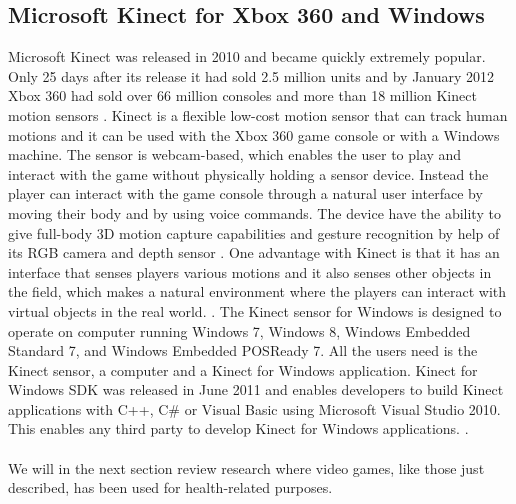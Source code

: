 \subsection{Microsoft Kinect for Xbox 360 and Windows}
Microsoft Kinect was released in 2010 and became quickly extremely popular. Only 25 days after its release it had sold 2.5 million units and by January 2012 Xbox 360 had sold over 66 million consoles and more than 18 million Kinect motion sensors \cite{consoles} \cite{kinectsold}. Kinect is a flexible low-cost motion sensor that can track human motions and it can be used with the Xbox 360 game console or with a Windows machine.  The sensor is webcam-based, which enables the user to play and interact with the game without physically holding a sensor device. Instead the player can interact with the game console through a natural user interface by moving their body and by using voice commands. The device have the ability to give full-body 3D motion capture capabilities and gesture recognition by help of its RGB camera and depth sensor \cite{kinect}. One advantage with Kinect is that it has an interface that senses players various motions and it also senses other objects in the field, which makes a natural environment where the players can interact with virtual objects in the real world. \cite{comparison}. The Kinect sensor for Windows is designed to operate on computer running Windows 7, Windows 8, Windows Embedded Standard 7, and Windows Embedded POSReady 7. All the users need is the Kinect sensor, a computer and a Kinect for Windows application. Kinect for Windows SDK was released in June 2011 and enables developers to build Kinect applications with C++, C\# or Visual Basic using Microsoft Visual Studio 2010. This enables any third party to develop Kinect for Windows applications. \cite{kinectwindows}.\\ \\
We will in the next section review research where video games, like those just described, has been used for health-related purposes.   

